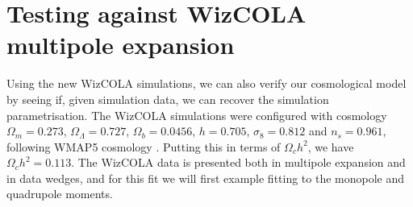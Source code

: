 \documentclass[titlesmallcaps, examinerscopy, copyrightpage]{uqthesis}
\begin{document}
\pagebreak
\section{Testing against WizCOLA multipole expansion}

Using the new WizCOLA simulations, we can also verify our cosmological model by seeing if, given simulation data, we can recover the simulation parametrisation. The WizCOLA simulations were configured with cosmology $\Omega_m = 0.273$, $\Omega_\Lambda = 0.727$, $\Omega_b = 0.0456$, $h=0.705$, $\sigma_8 = 0.812$ and $n_s = 0.961$, following WMAP5 cosmology \citep{Komatsu2009}. Putting this in terms of $\Omega_c h^2$, we have $\Omega_c h^2 = 0.113$. The WizCOLA data is presented both in multipole expansion and in data wedges, and for this fit we will first example fitting to the monopole and quadrupole moments.
\end{document}
